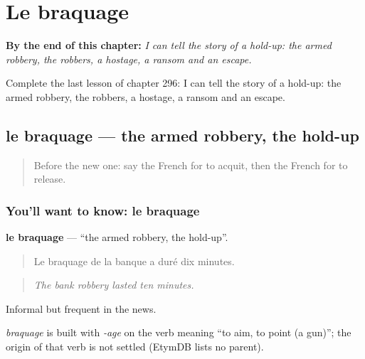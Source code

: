 
\chapter{Le braquage}
\label{ch:fr-le-braquage}

\begin{chapteropening}
\textbf{By the end of this chapter:} \emph{I can tell the story of a hold-up: the armed robbery, the robbers, a hostage, a ransom and an escape.}

Complete the last lesson of chapter 296: I can tell the story of a hold-up: the armed robbery, the robbers, a hostage, a ransom and an escape.
\end{chapteropening}

\section[le braquage]{le braquage — the armed robbery, the hold-up}

\label{lesson:FR-C296-braquage}



\begin{quote}
Before the new one: say the French for to acquit, then the French for to release.
\end{quote}

\subsection*{You'll want to know: le braquage}
\textbf{le braquage} — \textquotedblleft{}the armed robbery, the hold-up\textquotedblright{}.

\begin{quote}
Le braquage de la banque a duré dix minutes.
\end{quote}

\begin{quote}
\emph{The bank robbery lasted ten minutes.}
\end{quote}

Informal but frequent in the news.

\begin{cousinweb}
\emph{braquage} is built with \emph{-age} on the verb meaning \textquotedblleft{}to aim, to point (a gun)\textquotedblright{}; the origin of that verb is not settled (EtymDB lists no parent).
\end{cousinweb}

